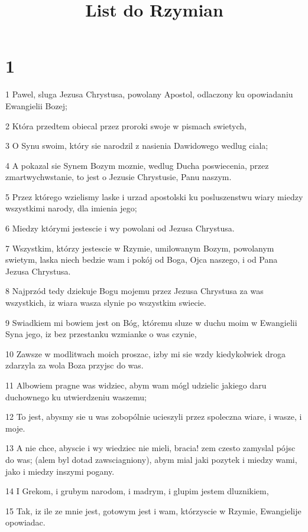 

\title{List do Rzymian}


\chapter{1}

\par 1 Pawel, sluga Jezusa Chrystusa, powolany Apostol, odlaczony ku opowiadaniu Ewangielii Bozej;
\par 2 Która przedtem obiecal przez proroki swoje w pismach swietych,
\par 3 O Synu swoim, który sie narodzil z nasienia Dawidowego wedlug ciala;
\par 4 A pokazal sie Synem Bozym moznie, wedlug Ducha poswiecenia, przez zmartwychwstanie, to jest o Jezusie Chrystusie, Panu naszym.
\par 5 Przez którego wzielismy laske i urzad apostolski ku posluszenstwu wiary miedzy wszystkimi narody, dla imienia jego;
\par 6 Miedzy którymi jestescie i wy powolani od Jezusa Chrystusa.
\par 7 Wszystkim, którzy jestescie w Rzymie, umilowanym Bozym, powolanym swietym, laska niech bedzie wam i pokój od Boga, Ojca naszego, i od Pana Jezusa Chrystusa.
\par 8 Najprzód tedy dziekuje Bogu mojemu przez Jezusa Chrystusa za was wszystkich, iz wiara wasza slynie po wszystkim swiecie.
\par 9 Swiadkiem mi bowiem jest on Bóg, któremu sluze w duchu moim w Ewangielii Syna jego, iz bez przestanku wzmianke o was czynie,
\par 10 Zawsze w modlitwach moich proszac, izby mi sie wzdy kiedykolwiek droga zdarzyla za wola Boza przyjsc do was.
\par 11 Albowiem pragne was widziec, abym wam mógl udzielic jakiego daru duchownego ku utwierdzeniu waszemu;
\par 12 To jest, abysmy sie u was zobopólnie ucieszyli przez spoleczna wiare, i wasze, i moje.
\par 13 A nie chce, abyscie i wy wiedziec nie mieli, bracia! zem czesto zamyslal pójsc do was; (alem byl dotad zawsciagniony), abym mial jaki pozytek i miedzy wami, jako i miedzy inszymi pogany.
\par 14 I Grekom, i grubym narodom, i madrym, i glupim jestem dluznikiem,
\par 15 Tak, iz ile ze mnie jest, gotowym jest i wam, którzyscie w Rzymie, Ewangielije opowiadac.
